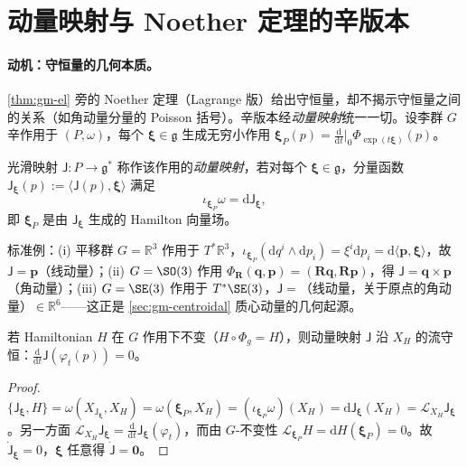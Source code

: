 \section{动量映射与 Noether 定理的辛版本}
\label{sec:gm-momentum-map}

\paragraph{动机：守恒量的几何本质。}
\cref{thm:gm-el} 旁的 Noether 定理（Lagrange 版）给出守恒量，却不揭示守恒量之间的关系（如角动量分量的 Poisson 括号）。辛版本经\emph{动量映射}统一一切。设李群 $G$ 辛作用于 $(P,\omega)$，每个 $\boldsymbol\xi\in\mathfrak g$ 生成无穷小作用 $\boldsymbol\xi_P(p)=\tfrac{\mathrm d}{\mathrm dt}|_0\Phi_{\exp(t\boldsymbol\xi)}(p)$。

\begin{definition}[动量映射]\label{def:gm-momentum-map}
光滑映射 $\mathsf J:P\to\mathfrak g^*$ 称作该作用的\emph{动量映射}，若对每个 $\boldsymbol\xi\in\mathfrak g$，分量函数 $\mathsf J_{\boldsymbol\xi}(p):=\langle\mathsf J(p),\boldsymbol\xi\rangle$ 满足
\begin{equation}
  \iota_{\boldsymbol\xi_P}\omega=\mathrm d\mathsf J_{\boldsymbol\xi},
  \label{eq:gm-momentum-map}
\end{equation}
即 $\boldsymbol\xi_P$ 是由 $\mathsf J_{\boldsymbol\xi}$ 生成的 Hamilton 向量场。
\end{definition}

标准例：(i) 平移群 $G=\mathbb R^3$ 作用于 $T^*\mathbb R^3$，$\iota_{\boldsymbol\xi_P}(\mathrm dq^i\wedge\mathrm dp_i)=\xi^i\mathrm dp_i=\mathrm d\langle\mathbf p,\boldsymbol\xi\rangle$，故 $\mathsf J=\mathbf p$（线动量）；(ii) $G=\SO(3)$ 作用 $\Phi_{\mathbf R}(\mathbf q,\mathbf p)=(\mathbf R\mathbf q,\mathbf R\mathbf p)$，得 $\mathsf J=\mathbf q\times\mathbf p$（角动量）；(iii) $G=\SE(3)$ 作用于 $T^*\SE(3)$，$\mathsf J=$（线动量，关于原点的角动量）$\in\mathbb R^6$——这正是 \cref{sec:gm-centroidal} 质心动量的几何起源。

\begin{theorem}\label{thm:gm-noether-symplectic}
若 Hamiltonian $H$ 在 $G$ 作用下不变（$H\circ\Phi_g=H$），则动量映射 $\mathsf J$ 沿 $X_H$ 的流守恒：$\tfrac{\mathrm d}{\mathrm dt}\mathsf J(\varphi_t(p))=0$。
\end{theorem}

\begin{proof}
$\{\mathsf J_{\boldsymbol\xi},H\}=\omega(X_{\mathsf J_{\boldsymbol\xi}},X_H)=\omega(\boldsymbol\xi_P,X_H)=(\iota_{\boldsymbol\xi_P}\omega)(X_H)=\mathrm d\mathsf J_{\boldsymbol\xi}(X_H)=\mathcal L_{X_H}\mathsf J_{\boldsymbol\xi}$。另一方面 $\mathcal L_{X_H}\mathsf J_{\boldsymbol\xi}=\tfrac{\mathrm d}{\mathrm dt}\mathsf J_{\boldsymbol\xi}(\varphi_t)$，而由 $G$-不变性 $\mathcal L_{\boldsymbol\xi_P}H=\mathrm dH(\boldsymbol\xi_P)=0$。故 $\dot{\mathsf J}_{\boldsymbol\xi}=0$，$\boldsymbol\xi$ 任意得 $\dot{\mathsf J}=\mathbf0$。
\end{proof}

